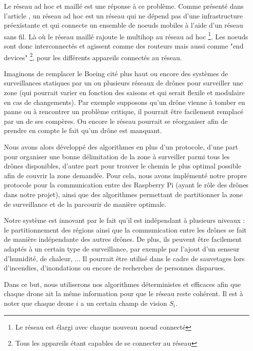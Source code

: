 \documentclass[journal, a4paper]{IEEEtran}
\begin{document}
        Le réseau ad hoc et maillé est une réponse à ce problème. Comme présenté dans l'article \cite{bruno2005mesh}, un réseau ad hoc est un réseau qui ne dépend pas d'une infrastructure préexistante et qui connecte un ensemble de noeuds mobiles à l'aide d'un réseau sans fil. 
        Là où le réseau maillé rajoute le multihop au réseau ad hoc \footnote{Le réseau est élargi avec chaque nouveau noeud connecté}.
        Les noeuds sont donc interconnectés et agissent comme des routeurs mais aussi comme "end devices" \footnote{Tous les appareils étant capables de se connecter au réseau}, pour les différents appareils connectés au réseau.

        Imaginons de remplacer le Boeing cité plus haut ou encore des systèmes de surveillances statiques par un ou plusieurs réseaux de drônes pour surveiller une zone 
        (qui pourrait varier en fonction des saisons et qui serait flexile et modulaire en cas de changements). Par exemple supposons qu'un drône vienne à tomber en panne ou à rencontrer un 
        problème critique, il pourrait être facilement remplacé par un de ses compères. Ou encore le réseau pourrait se réorganiser afin de prendre en compte le fait qu'un drône est manquant. 

        Nous avons alors développé des algorithmes en plus d'un protocole, d'une part pour organiser une bonne délimitation de la zone à surveiller
        parmi tous les drônes disponibles, d'autre part pour trouver le chemin le plus optimal possible afin de couvrir la zone demandée.
        Pour cela, nous avons implémenté notre propre protocole pour la communication entre des Raspberry Pi (ayant le rôle des drônes dans notre projet), ainsi 
        que des algorithmes permettant de partitionner la zone de surveillance et de la parcourir de manière optimale. 

        Notre système est innovant par le fait qu’il est indépendant à plusieurs niveaux : le partitionnement des régions ainsi que la communication entre les drônes se fait de manière 
        indépendante des autres drônes. De plus, ils peuvent être facilement adaptés à un certain type de surveillance, par exemple par l’ajout d’un senseur d’humidité, de chaleur, ... 
        Il pourrait être utilisé dans le cadre de sauvetages lors d’incendies, d’inondations ou encore de recherches de personnes disparues. 

        Dans ce but, nous utiliserons nos algorithmes déterministes et efficaces afin que chaque drone ait la même information pour que le réseau reste cohérent. Il est à noter que 
        chaque drone $i$ a un certain champ de vision $S_i$.
\end{document}
